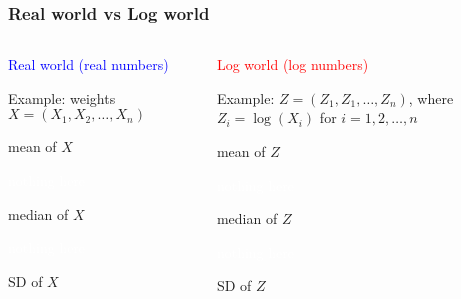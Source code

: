 \documentclass[11pt]{beamer}
\newcommand{\myframe}[1]{\begin{frame} \frametitle{#1}}
\begin{document}
\myframe{Real world vs Log world}
\begin{columns}
\begin{column}{0.45\textwidth}
\textcolor{blue}{Real world (real numbers)}

Example: weights $X = (X_1, X_2, \dots, X_n)$

\begin{center}
\end{center}

\centering
mean of $X$

\textcolor{white}{nothing here}

median of $X$

\textcolor{white}{nothing here}

SD of $X$
\end{column}

\begin{column}{0.1\textwidth}

\vspace{5cm}

\end{column}

\begin{column}{0.45\textwidth}
\textcolor{red}{Log world (log numbers)}

Example: {\fontsize{9pt}{7.2}\selectfont $Z = (Z_1, Z_1, \dots, Z_n)$, where $Z_i = \log(X_i)$ for} {\tiny $i = 1, 2, \dots, n$}

\begin{center}
\end{center}

\centering
mean of $Z$

\textcolor{white}{nothing here}

median of $Z$

\textcolor{white}{nothing here}

SD of $Z$
\end{column}
\end{columns}
\end{frame}
\end{document}
